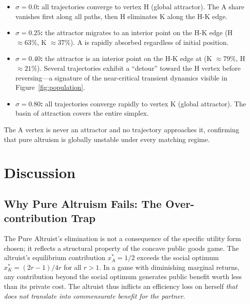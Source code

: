\documentclass[12pt]{article}
\begin{document}
\begin{itemize}
    \item \textbf{$\sigma = 0.0$:} all trajectories converge to vertex H (global attractor). The A share vanishes first along all paths, then H eliminates K along the H-K edge.

    \item \textbf{$\sigma = 0.25$:} the attractor migrates to an interior point on the H-K edge (H $\approx 63\%$, K $\approx 37\%$). A is rapidly absorbed regardless of initial position.

    \item \textbf{$\sigma = 0.40$:} the attractor is an interior point on the H-K edge at (K $\approx 79\%$, H $\approx 21\%$). Several trajectories exhibit a ``detour'' toward the H vertex before reversing---a signature of the near-critical transient dynamics visible in Figure~\ref{fig:population}.

    \item \textbf{$\sigma = 0.80$:} all trajectories converge rapidly to vertex K (global attractor). The basin of attraction covers the entire simplex.
\end{itemize}

The A vertex is never an attractor and no trajectory approaches it, confirming that pure altruism is globally unstable under every matching regime.

\section{Discussion}\label{sec:discussion}

\subsection{Why Pure Altruism Fails: The Over-contribution Trap}

The Pure Altruist's elimination is not a consequence of the specific utility form chosen; it reflects a structural property of the concave public goods game. The altruist's equilibrium contribution $x_A^* = 1/2$ exceeds the social optimum $x_K^* = (2r-1)/4r$ for all $r > 1$. In a game with diminishing marginal returns, any contribution beyond the social optimum generates public benefit worth less than its private cost. The altruist thus inflicts an efficiency loss on herself \emph{that does not translate into commensurate benefit for the partner}.
\end{document}
